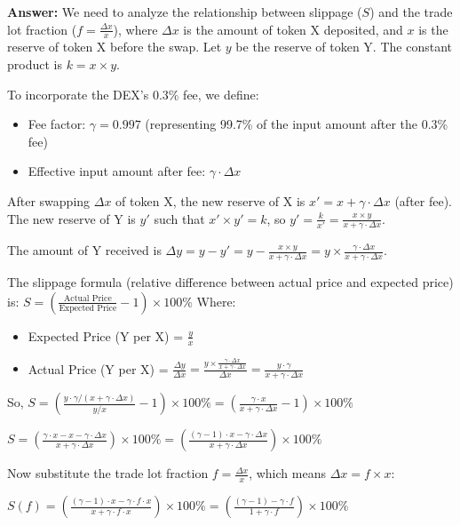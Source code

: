 \documentclass[12pt]{article}
\begin{document}
\textbf{Answer:} We need to analyze the relationship between slippage ($S$) and the trade lot fraction ($f = \frac{\Delta x}{x}$), where $\Delta x$ is the amount of token X deposited, and $x$ is the reserve of token X before the swap. Let $y$ be the reserve of token Y. The constant product is $k = x \times y$.

To incorporate the DEX's 0.3\% fee, we define:
\begin{itemize}
    \item Fee factor: $\gamma = 0.997$ (representing 99.7\% of the input amount after the 0.3\% fee)
    \item Effective input amount after fee: $\gamma \cdot \Delta x$
\end{itemize}

After swapping $\Delta x$ of token X, the new reserve of X is $x' = x + \gamma \cdot \Delta x$ (after fee). The new reserve of Y is $y'$ such that $x' \times y' = k$, so $y' = \frac{k}{x'} = \frac{x \times y}{x + \gamma \cdot \Delta x}$.

The amount of Y received is $\Delta y = y - y' = y - \frac{x \times y}{x + \gamma \cdot \Delta x} = y \times \frac{\gamma \cdot \Delta x}{x + \gamma \cdot \Delta x}$.

The slippage formula (relative difference between actual price and expected price) is:
$S = \left( \frac{\text{Actual Price}}{\text{Expected Price}} - 1 \right) \times 100\%$
Where:
\begin{itemize}
    \item Expected Price (Y per X) = $\frac{y}{x}$
    \item Actual Price (Y per X) = $\frac{\Delta y}{\Delta x} = \frac{y \times \frac{\gamma \cdot \Delta x}{x + \gamma \cdot \Delta x}}{\Delta x} = \frac{y \cdot \gamma}{x + \gamma \cdot \Delta x}$
\end{itemize}

So,
$S = \left( \frac{y \cdot \gamma / (x + \gamma \cdot \Delta x)}{y / x} - 1 \right) \times 100\% = \left( \frac{\gamma \cdot x}{x + \gamma \cdot \Delta x} - 1 \right) \times 100\%$

$S = \left( \frac{\gamma \cdot x - x - \gamma \cdot \Delta x}{x + \gamma \cdot \Delta x} \right) \times 100\% = \left( \frac{(\gamma - 1) \cdot x - \gamma \cdot \Delta x}{x + \gamma \cdot \Delta x} \right) \times 100\%$

Now substitute the trade lot fraction $f = \frac{\Delta x}{x}$, which means $\Delta x = f \times x$:

$S(f) = \left( \frac{(\gamma - 1) \cdot x - \gamma \cdot f \cdot x}{x + \gamma \cdot f \cdot x} \right) \times 100\% = \left( \frac{(\gamma - 1) - \gamma \cdot f}{1 + \gamma \cdot f} \right) \times 100\%$
\end{document}
